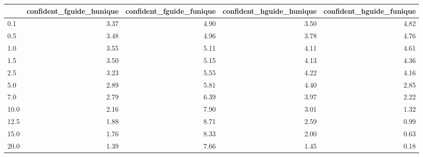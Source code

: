 \begin{tabular}{lrrrr}
\toprule
 & confident_fguide_hunique & confident_fguide_funique & confident_hguide_hunique & confident_hguide_funique \\
\midrule
0.1 & 3.37 & 4.90 & 3.50 & 4.82 \\
0.5 & 3.48 & 4.96 & 3.78 & 4.76 \\
1.0 & 3.55 & 5.11 & 4.11 & 4.61 \\
1.5 & 3.50 & 5.15 & 4.13 & 4.36 \\
2.5 & 3.23 & 5.55 & 4.22 & 4.16 \\
5.0 & 2.89 & 5.81 & 4.40 & 2.85 \\
7.0 & 2.79 & 6.39 & 3.97 & 2.22 \\
10.0 & 2.16 & 7.90 & 3.01 & 1.32 \\
12.5 & 1.88 & 8.71 & 2.59 & 0.99 \\
15.0 & 1.76 & 8.33 & 2.00 & 0.63 \\
20.0 & 1.39 & 7.66 & 1.45 & 0.18 \\
\bottomrule
\end{tabular}
